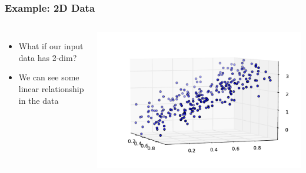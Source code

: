 \begin{frame}
    \frametitle{Example: 2D Data}
    \begin{columns}
            \begin{itemize}
                \item What if our input data has 2-dim?
                \item We can see some linear relationship in the data
            \end{itemize}
            \includegraphics[width=1\linewidth]{linreg-pics/only_data}\\

    \end{columns}
\end{frame}



